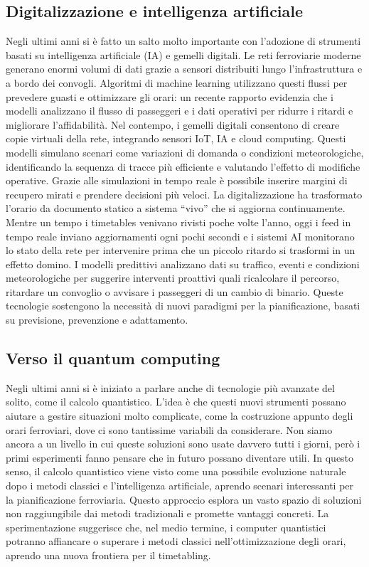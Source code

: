 \documentclass[a4paper,12pt]{report}
\begin{document}
\subsection{Digitalizzazione e intelligenza artificiale}
Negli ultimi anni si è fatto un salto molto importante con l’adozione di strumenti basati su intelligenza artificiale (IA) e gemelli digitali. Le reti ferroviarie moderne generano enormi volumi di dati grazie a sensori distribuiti lungo l’infrastruttura e a bordo dei convogli. Algoritmi di machine learning utilizzano questi flussi per prevedere guasti e ottimizzare gli orari: un recente rapporto evidenzia che i modelli analizzano il flusso di passeggeri e i dati operativi per ridurre i ritardi e migliorare l’affidabilità.
Nel contempo, i gemelli digitali consentono di creare copie virtuali della rete, integrando sensori IoT, IA e cloud computing. Questi modelli simulano scenari come variazioni di domanda o condizioni meteorologiche, identificando la sequenza di tracce più efficiente e valutando l’effetto di modifiche operative.
Grazie alle simulazioni in tempo reale è possibile inserire margini di recupero mirati e prendere decisioni più veloci.
La digitalizzazione ha trasformato l’orario da documento statico a sistema “vivo” che si aggiorna continuamente. Mentre un tempo i timetables venivano rivisti poche volte l’anno, oggi i feed in tempo reale inviano aggiornamenti ogni pochi secondi e i sistemi AI monitorano lo stato della rete per intervenire prima che un piccolo ritardo si trasformi in un effetto domino.
I modelli predittivi analizzano dati su traffico, eventi e condizioni meteorologiche per suggerire interventi proattivi quali ricalcolare il percorso, ritardare un convoglio o avvisare i passeggeri di un cambio di binario.
Queste tecnologie sostengono la necessità di nuovi paradigmi per la pianificazione, basati su previsione, prevenzione e adattamento.
\subsection{Verso il quantum computing}
Negli ultimi anni si è iniziato a parlare anche di tecnologie più avanzate del solito, come il calcolo quantistico. L’idea è che questi nuovi strumenti possano aiutare a gestire situazioni molto complicate, come la costruzione appunto degli orari ferroviari, dove ci sono tantissime variabili da considerare. Non siamo ancora a un livello in cui queste soluzioni sono usate davvero tutti i giorni, però i primi esperimenti fanno pensare che in futuro possano diventare utili. In questo senso, il calcolo quantistico viene visto come una possibile evoluzione naturale dopo i metodi classici e l’intelligenza artificiale, aprendo scenari interessanti per la pianificazione ferroviaria.
Questo approccio esplora un vasto spazio di soluzioni non raggiungibile dai metodi tradizionali e promette vantaggi concreti. La sperimentazione suggerisce che, nel medio termine, i computer quantistici potranno affiancare o superare i metodi classici nell’ottimizzazione degli orari, aprendo una nuova frontiera per il timetabling.
\end{document}
